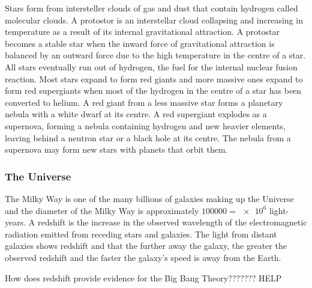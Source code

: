Stars form from intersteller clouds of gas and dust that contain hydrogen called molecular clouds.
A protostor is an interstellar cloud collapsing and increasing in temperature as a result of
its internal gravitational attraction. A protostar becomes a stable star when the inward force of
gravitational attraction is balanced by an outward force due to the high temperature in the centre
of a star. All stars eventually run out of hydrogen, the fuel for the internal nuclear fusion 
reaction. Most stars expand to form red giants and more massive ones expand to form red supergiants
when most of the hydrogen in the centre of a star has been converted to helium. A red giant from a
less massive star forms a planetary nebula with a white dwarf at its centre. A red supergiant
explodes as a supernova, forming a nebula containing hydrogen and new heavier elements, leaving
behind a neutron star or a black hole at its centre. The nebula from a supernova may form new
stars with planets that orbit them.

\subsubsection{The Universe}

The Milky Way is one of the many billions of galaxies making up the Universe and the diameter of
the Milky Way is approximately $ 100 000 = \num{e6} $ light-years. A redshift is the increase in
the observed wavelength of the electromagnetic radiation emitted from receding stars and galaxies.
The light from distant galaxies shows redshift and that the further away the galaxy, the greater
the observed redshift and the faster the galaxy's speed is away from the Earth.

How does redshift provide evidence for the Big Bang Theory??????? HELP
